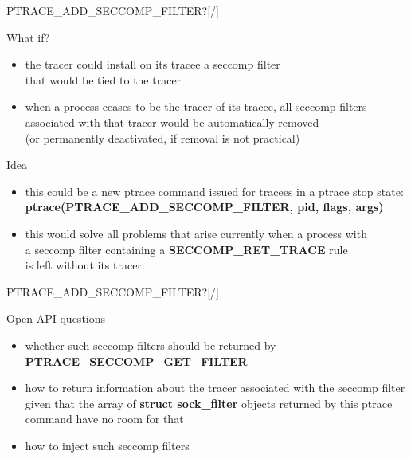\documentclass[unicode,aspectratio=169,xcolor={table,dvipsnames,usernames}]{beamer}
\begin{document}
\begin{frame}{\Large PTRACE\_ADD\_SECCOMP\_FILTER?\hfill [\insertframenumber/\inserttotalframenumber]}
\large
\begin{block}{What if?}
\begin{itemize}
	\item the tracer could install on its tracee a seccomp filter \\
		that would be tied to the tracer
	\item when a process ceases to be the tracer of its tracee, all seccomp filters \\
		associated with that tracer would be automatically removed \\
		(or permanently deactivated, if removal is not practical)
\end{itemize}
\end{block}

\begin{block}{Idea}
\begin{itemize}
	\item this could be a new ptrace command issued for tracees in a ptrace stop state:
		\textbf{ptrace(PTRACE\_ADD\_SECCOMP\_FILTER, pid, flags, args)}
	\item this would solve all problems that arise currently when a process with \\
		a seccomp filter containing a \textbf{SECCOMP\_RET\_TRACE} rule \\
		is left without its tracer.
\end{itemize}
\end{block}
\end{frame}

\begin{frame}{\Large PTRACE\_ADD\_SECCOMP\_FILTER?\hfill [\insertframenumber/\inserttotalframenumber]}
\Large
\begin{block}{Open API questions}
\begin{itemize}
	\item whether such seccomp filters should be returned by \textbf{PTRACE\_SECCOMP\_GET\_FILTER}
	\item how to return information about the tracer associated with
		the seccomp filter given that the array of \textbf{struct sock\_filter} objects
		returned by this ptrace command have no room for that
	\item how to inject such seccomp filters
\end{itemize}
\end{block}
\end{frame}
\end{document}
